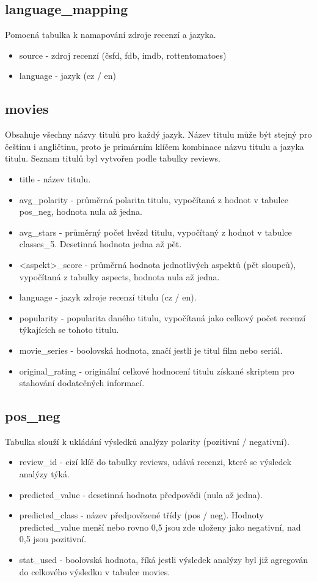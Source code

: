 \subsection{language\_mapping}
Pomocná tabulka k namapování zdroje recenzí a jazyka.
\begin{itemize}
    \item source - zdroj recenzí (čsfd, fdb, imdb, rottentomatoes)
    \item language - jazyk (cz / en)
\end{itemize}

\subsection{movies}
Obsahuje všechny názvy titulů pro každý jazyk. Název titulu může být stejný pro češtinu i angličtinu, proto je primárním klíčem kombinace názvu titulu a jazyka titulu. Seznam titulů byl vytvořen podle tabulky reviews.
\begin{itemize}
    \item title - název titulu.
    \item avg\_polarity - průměrná polarita titulu, vypočítaná z hodnot v tabulce pos\_neg, hodnota nula až jedna.
    \item avg\_stars - průměrný počet hvězd titulu, vypočítaný z hodnot v tabulce classes\_5. Desetinná hodnota jedna až pět.
    \item <aspekt>\_score - průměrná hodnota jednotlivých aspektů (pět sloupců), vypočítaná z tabulky aspects, hodnota nula až jedna.
    \item language - jazyk zdroje recenzí titulu (cz / en).
    \item popularity - popularita daného titulu, vypočítaná jako celkový počet recenzí týkajících se tohoto titulu.
    \item movie\_series - boolovská hodnota, značí jestli je titul film nebo seriál.
    \item original\_rating - originální celkové hodnocení titulu získané skriptem pro stahování dodatečných informací.
\end{itemize}

\subsection{pos\_neg}
Tabulka slouží k ukládání výsledků analýzy polarity (pozitivní / negativní).
\begin{itemize}
    \item review\_id - cizí klíč do tabulky reviews, udává recenzi, které se výsledek analýzy týká.
    \item predicted\_value - desetinná hodnota předpovědi (nula až jedna).
    \item predicted\_class - název předpovězené třídy (pos / neg). Hodnoty predicted\_value menší nebo rovno 0,5 jsou zde uloženy jako negativní, nad 0,5 jsou pozitivní.
    \item stat\_used - boolovská hodnota, říká jestli výsledek analýzy byl již agregován do celkového výsledku v tabulce movies.
\end{itemize}

